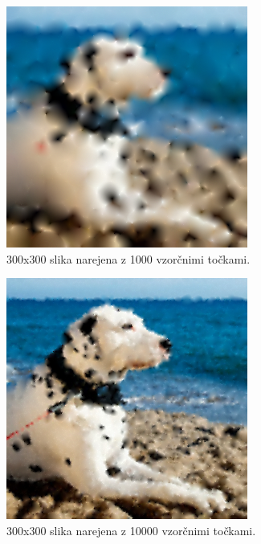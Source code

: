 \documentclass{egpubl}
\begin{document}
	\begin{figure}[!htb]
		\centering
		\parbox[t]{.7\columnwidth}{\relax
			\includegraphics[width=.95\linewidth]{300x300x1000_result.png}
		}
		\caption{\label{fig:300x300x1000}
			300x300 slika narejena z 1000 vzorčnimi točkami.}
	\end{figure}

	\begin{figure}[!htb]
		\centering
		\parbox[t]{.7\columnwidth}{\relax
			\includegraphics[width=.95\linewidth]{300x300x10000_result.png}
		}
		\caption{\label{fig:300x300x10000}
			300x300 slika narejena z 10000 vzorčnimi točkami.}
	\end{figure}
\end{document}
